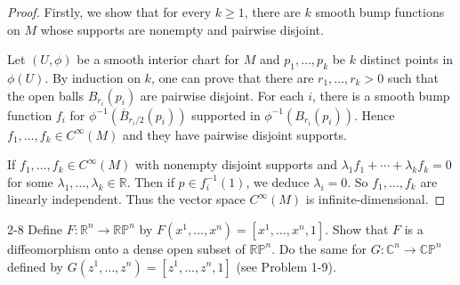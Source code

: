 \begin{proof}
    Firstly, we show that for every \( k \ge 1 \), there are \( k \) smooth bump functions on \( M \) whose supports are nonempty and pairwise disjoint.

    Let \( (U, \phi) \) be a smooth interior chart for \( M \) and \( p_{1}, \ldots, p_{k} \) be \( k \) distinct points in \( \phi(U) \). By induction on \( k \), one can prove that there are \( r_{1}, \ldots, r_{k} > 0 \) such that the open balls \( B_{r_{i}}(p_{i}) \) are pairwise disjoint. For each \( i \), there is a smooth bump function \( f_{i} \) for \( \phi^{-1}(\overline{B}_{r_{i}/2}(p_{i})) \) supported in \( \phi^{-1}(B_{r_{i}}(p_{i})) \). Hence \( f_{1}, \ldots, f_{k} \in C^{\infty}(M) \) and they have pairwise disjoint supports.

    If \( f_{1}, \ldots, f_{k} \in C^{\infty}(M) \) with nonempty disjoint supports and \( \lambda_{1}f_{1} + \cdots + \lambda_{k}f_{k} = 0 \) for some \( \lambda_{1}, \ldots, \lambda_{k} \in \mathbb{R} \). Then if \( p \in f_{i}^{-1}(1) \), we deduce \( \lambda_{i} = 0 \). So \( f_{1}, \ldots, f_{k} \) are linearly independent. Thus the vector space \( C^{\infty}(M) \) is infinite-dimensional.
\end{proof}

\begin{problem}{2-8}
    Define \( F: \mathbb{R}^{n} \to \mathbb{RP}^{n} \) by \( F(x^{1}, \ldots, x^{n}) = [x^{1}, \ldots, x^{n}, 1] \). Show that \( F \) is a diffeomorphism onto a dense open subset of \( \mathbb{RP}^{n} \). Do the same for \( G: \mathbb{C}^{n} \to \mathbb{CP}^{n} \) defined by \( G(z^{1}, \ldots, z^{n}) = [z^{1}, \ldots, z^{n}, 1] \) (see Problem 1-9).
\end{problem}

